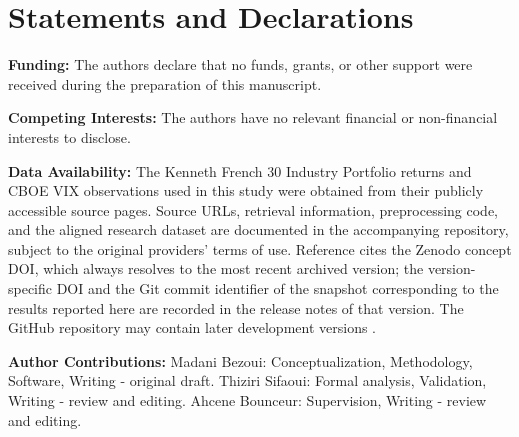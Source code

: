 \documentclass[smallcondensed]{svjour3}
\begin{document}


\section*{Statements and Declarations}

\textbf{Funding:} The authors declare that no funds, grants, or other support were received during the preparation of this manuscript.

\textbf{Competing Interests:} The authors have no relevant financial or non-financial interests to disclose.

\textbf{Data Availability:} The Kenneth French 30 Industry Portfolio returns \cite{french2026data} and CBOE VIX observations \cite{cboe2026vix} used in this study were obtained from their publicly accessible source pages. Source URLs, retrieval information, preprocessing code, and the aligned research dataset are documented in the accompanying repository, subject to the original providers' terms of use. Reference \cite{bezoui2026robust} cites the Zenodo concept DOI, which always resolves to the most recent archived version; the version-specific DOI and the Git commit identifier of the snapshot corresponding to the results reported here are recorded in the release notes of that version. The GitHub repository may contain later development versions \cite{bezoui2026robust}.

\textbf{Author Contributions:} Madani Bezoui: Conceptualization, Methodology, Software, Writing - original draft. Thiziri Sifaoui: Formal analysis, Validation, Writing - review and editing. Ahcene Bounceur: Supervision, Writing - review and editing.


\end{document}
